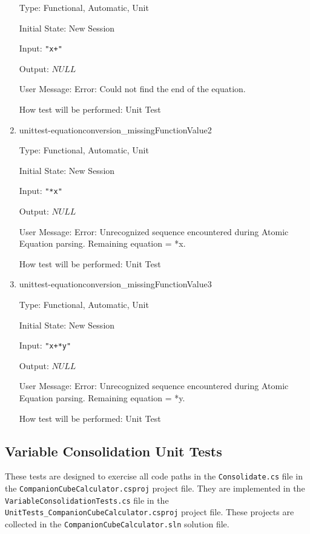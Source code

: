 \documentclass[12pt, titlepage]{article}
\begin{document}
\begin{enumerate}
	Type: Functional, Automatic, Unit
	
	Initial State: New Session
	
	Input: \texttt{"x+"}
	
	Output: $NULL$
	
	User Message: Error: Could not find the end of the equation. 
	
	How test will be performed: Unit Test\\
	
	\item{unittest-equationconversion\_missingFunctionValue2}
	
	Type: Functional, Automatic, Unit
	
	Initial State: New Session
	
	Input: \texttt{"*x"}
	
	Output:	$NULL$
	
	User Message: Error: Unrecognized sequence encountered during Atomic 
	Equation parsing. Remaining equation = *x.
	
	How test will be performed: Unit Test\\
	
	\item{unittest-equationconversion\_missingFunctionValue3}
	
	Type: Functional, Automatic, Unit
	
	Initial State: New Session
	
	Input: \texttt{"x+*y"}
	
	Output:	$NULL$
	
	User Message: Error: Unrecognized sequence encountered during Atomic 
	Equation parsing. Remaining equation = *y.
	
	How test will be performed: Unit Test\\
	
\end{enumerate}

\subsection{Variable Consolidation Unit Tests}
These tests are designed to exercise all code paths in the 
\texttt{Consolidate.cs} 
file in the \texttt{CompanionCubeCalculator.csproj} project file. They are 
implemented in the \texttt{VariableConsolidationTests.cs} file in the \\
\texttt{UnitTests\_CompanionCubeCalculator.csproj} project file. These projects 
are collected in the \texttt{CompanionCubeCalculator.sln} solution file.
\end{document}
